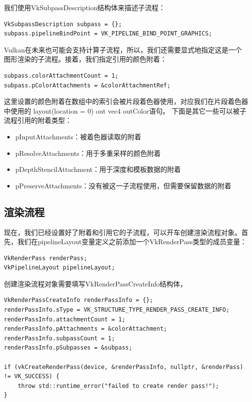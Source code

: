 \documentclass{ctexart}
\begin{document}
我们使用VkSubpassDescription结构体来描述子流程：

\begin{lstlisting}[language={[ANSI]C}]
VkSubpassDescription subpass = {};
subpass.pipelineBindPoint = VK_PIPELINE_BIND_POINT_GRAPHICS;
\end{lstlisting}

Vulkan在未来也可能会支持计算子流程，所以，我们还需要显式地指定这是一个图形渲染的子流程。接着，我们指定引用的颜色附着：

\begin{lstlisting}[language={[ANSI]C}]
subpass.colorAttachmentCount = 1;
subpass.pColorAttachments = &colorAttachmentRef;
\end{lstlisting}

这里设置的颜色附着在数组中的索引会被片段着色器使用，对应我们在片段着色器中使用的 layout(location = 0) out vec4 outColor语句。
下面是其它一些可以被子流程引用的附着类型：

\begin{itemize}
	\item pInputAttachments：被着色器读取的附着
	\item pResolveAttachments：用于多重采样的颜色附着
	\item pDepthStencilAttachment：用于深度和模板数据的附着
	\item pPreserveAttachments：没有被这一子流程使用，但需要保留数据的附着
\end{itemize}

\subsection{渲染流程}

现在，我们已经设置好了附着和引用它的子流程，可以开车创建渲染流程对象。首先，我们在pipelineLayout变量定义之前添加一个VkRenderPass类型的成员变量：

\begin{lstlisting}[language={[ANSI]C}]
VkRenderPass renderPass;
VkPipelineLayout pipelineLayout;
\end{lstlisting}

创建渲染流程对象需要填写VkRenderPassCreateInfo结构体，

\begin{lstlisting}[language={[ANSI]C}]
VkRenderPassCreateInfo renderPassInfo = {};
renderPassInfo.sType = VK_STRUCTURE_TYPE_RENDER_PASS_CREATE_INFO;
renderPassInfo.attachmentCount = 1;
renderPassInfo.pAttachments = &colorAttachment;
renderPassInfo.subpassCount = 1;
renderPassInfo.pSubpasses = &subpass;

if (vkCreateRenderPass(device, &renderPassInfo, nullptr, &renderPass) != VK_SUCCESS) {
	throw std::runtime_error("failed to create render pass!");
}
\end{lstlisting}
\end{document}
